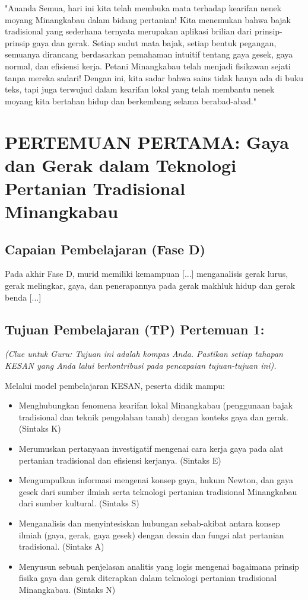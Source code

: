 \documentclass[12pt,a4paper]{article}
\begin{document}
"Ananda Semua, hari ini kita telah membuka mata terhadap kearifan nenek moyang Minangkabau dalam bidang pertanian! Kita menemukan bahwa bajak tradisional yang sederhana ternyata merupakan aplikasi brilian dari prinsip-prinsip gaya dan gerak. Setiap sudut mata bajak, setiap bentuk pegangan, semuanya dirancang berdasarkan pemahaman intuitif tentang gaya gesek, gaya normal, dan efisiensi kerja. Petani Minangkabau telah menjadi fisikawan sejati tanpa mereka sadari! Dengan ini, kita sadar bahwa sains tidak hanya ada di buku teks, tapi juga terwujud dalam kearifan lokal yang telah membantu nenek moyang kita bertahan hidup dan berkembang selama berabad-abad."

\section{PERTEMUAN PERTAMA: Gaya dan Gerak dalam Teknologi Pertanian Tradisional Minangkabau}

\subsection{Capaian Pembelajaran (Fase D)}
Pada akhir Fase D, murid memiliki kemampuan [...] menganalisis gerak lurus, gerak melingkar, gaya, dan penerapannya pada gerak makhluk hidup dan gerak benda [...]

\subsection{Tujuan Pembelajaran (TP) Pertemuan 1:}
\textit{(Clue untuk Guru: Tujuan ini adalah kompas Anda. Pastikan setiap tahapan KESAN yang Anda lalui berkontribusi pada pencapaian tujuan-tujuan ini).}

Melalui model pembelajaran KESAN, peserta didik mampu:
\begin{itemize}
\item Menghubungkan fenomena kearifan lokal Minangkabau (penggunaan bajak tradisional dan teknik pengolahan tanah) dengan konteks gaya dan gerak. (Sintaks K)
\item Merumuskan pertanyaan investigatif mengenai cara kerja gaya pada alat pertanian tradisional dan efisiensi kerjanya. (Sintaks E)
\item Mengumpulkan informasi mengenai konsep gaya, hukum Newton, dan gaya gesek dari sumber ilmiah serta teknologi pertanian tradisional Minangkabau dari sumber kultural. (Sintaks S)
\item Menganalisis dan menyintesiskan hubungan sebab-akibat antara konsep ilmiah (gaya, gerak, gaya gesek) dengan desain dan fungsi alat pertanian tradisional. (Sintaks A)
\item Menyusun sebuah penjelasan analitis yang logis mengenai bagaimana prinsip fisika gaya dan gerak diterapkan dalam teknologi pertanian tradisional Minangkabau. (Sintaks N)
\end{itemize}
\end{document}
